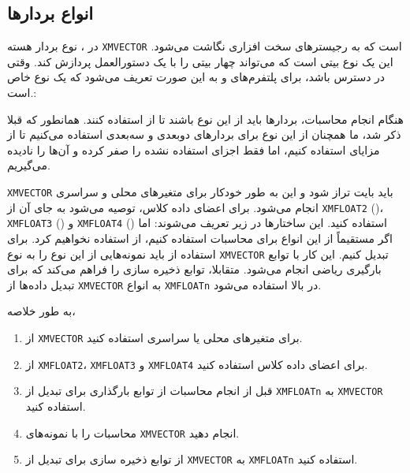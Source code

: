 \subsection{\textbf{انواع بردارها}}
\label{subsec:1.6.1}
{
    \Large
    \begin{spacing}{1.5}
        در ، نوع بردار هسته \texttt{XMVECTOR} است که به رجیسترهای سخت افزاری  نگاشت می‌شود.
        این یک نوع  بیتی است که می‌تواند چهار   بیتی را با یک دستورالعمل  پردازش کند.
        وقتی  در دسترس باشد، برای پلتفرم‌های  و  به این صورت تعریف می‌شود که  یک نوع  خاص است.:

        \begin{flushleft}
        \end{flushleft}

        هنگام انجام محاسبات، بردارها باید از این نوع باشند تا از  استفاده کنند.
        همانطور که قبلا ذکر شد، ما همچنان از این نوع برای بردارهای دو‌بعدی و سه‌بعدی استفاده می‌کنیم تا از مزایای  استفاده کنیم،
        اما فقط اجزای استفاده نشده را صفر کرده و آن‌ها را نادیده می‌گیریم.

        \texttt{XMVECTOR} باید  بایت تراز شود و این به طور خودکار برای متغیرهای محلی و سراسری انجام می‌شود.
        برای اعضای داده کلاس، توصیه می‌شود به جای آن از \texttt{XMFLOAT2} ()، \texttt{XMFLOAT3} () و \texttt{XMFLOAT4} () استفاده کنید. این ساختارها در زیر تعریف می‌شوند:
        \textbf{\vspace{6pt}}
        \lr{}
        \textbf{\vspace{6pt}}
        اما اگر مستقیماً از این انواع برای محاسبات استفاده کنیم، از  استفاده نخواهیم کرد.
        برای استفاده از  باید نمونه‌هایی از این نوع را به نوع \texttt{XMVECTOR} تبدیل کنیم.
        این کار با توابع بارگیری ریاضی  انجام می‌شود.
        متقابلا،  توابع ذخیره سازی را فراهم می‌کند که برای تبدیل داده‌ها از \texttt{XMVECTOR} به انواع \texttt{XMFLOATn} در بالا استفاده می‌شود.

        به طور خلاصه،

        \begin{enumerate}[label=\textbf{\arabic*}.]
            \item {از \texttt{XMVECTOR} برای متغیرهای محلی یا سراسری استفاده کنید.}
            \item {از \texttt{XMFLOAT2}، \texttt{XMFLOAT3} و \texttt{XMFLOAT4} برای اعضای داده کلاس استفاده کنید.}
            \item {قبل از انجام محاسبات از توابع بارگذاری برای تبدیل از \texttt{XMFLOATn} به \texttt{XMVECTOR} استفاده کنید.}
            \item {محاسبات را با نمونه‌های \texttt{XMVECTOR} انجام دهید.}
            \item {از توابع ذخیره سازی برای تبدیل از \texttt{XMVECTOR} به \texttt{XMFLOATn} استفاده کنید.}
        \end{enumerate}
    \end{spacing}
}

